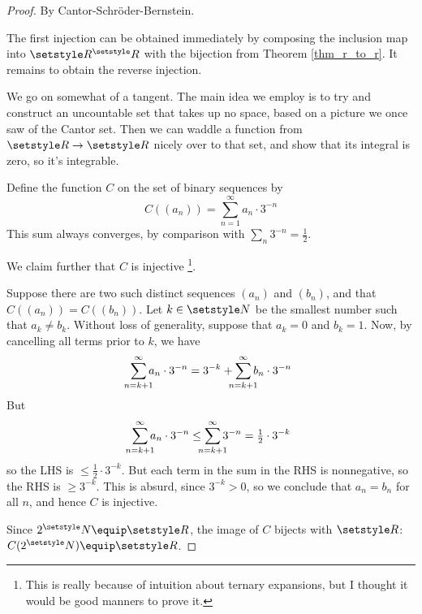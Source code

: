 \documentclass[fleqn,a4paper,11pt]{article}
\begin{document}
 \begin{proof}
  By Cantor-Schr\"oder-Bernstein.

  The first injection can be obtained immediately by composing the inclusion map
  into \(\R^\R\) with the bijection from Theorem \ref{thm_r_to_r}. It remains to
  obtain the reverse injection.

  We go on somewhat of a tangent. The main idea we employ is to try and
  construct an uncountable set that takes up no space, based on a picture we
  once saw of the Cantor set. Then we can waddle a function from \(\R \to \R\)
  nicely over to that set, and show that its integral is zero, so it's
  integrable.

  Define the function \(C\) on the set of binary sequences by
  \begin{equation*}
   C((a_n)) = \sum_{n = 1}^\infty a_n \cdot 3^{-n}
  \end{equation*}
  This sum always converges, by comparison with \(\sum_n 3^{-n} = \frac 12\).

  We claim further that \(C\) is injective%
  \footnote{
   This is really because of intuition about ternary expansions, but I thought
   it would be good manners to prove it.
  }.

  Suppose there are two such distinct sequences \((a_n)\) and \((b_n)\), and
  that \(C((a_n)) = C((b_n))\). Let \(k \in \N\) be the smallest number such
  that \(a_k \ne b_k\). Without loss of generality, suppose that \(a_k = 0\) and
  \(b_k = 1\). Now, by cancelling all terms prior to \(k\), we have
  \begin{equation*}
   \sum_{\mathclap{n = k + 1}}^\infty a_n \cdot 3^{-n}
    = 3^{-k} + \sum_{\mathclap{n = k + 1}}^\infty b_n \cdot 3^{-n}
  \end{equation*}
  But
  \begin{equation*}
   \sum_{\mathclap{n = k + 1}}^\infty a_n \cdot 3^{-n}
    \le \sum_{\mathclap{n = k + 1}}^\infty 3^{-n}
    = \tfrac 12 \cdot 3^{-k}
  \end{equation*}
  so the LHS is \(\le \tfrac 12 \cdot 3^{-k}\). But each term in the sum in the
  RHS is nonnegative, so the RHS is \(\ge 3^{-k}\). This is absurd, since
  \(3^{-k} > 0\), so we conclude that \(a_n = b_n\) for all \(n\), and hence
  \(C\) is injective.

  Since \(2^\N \equip \R\), the image of \(C\) bijects with \(\R\):
  \(C(2^\N) \equip \R\).


\end{proof}
\end{document}
